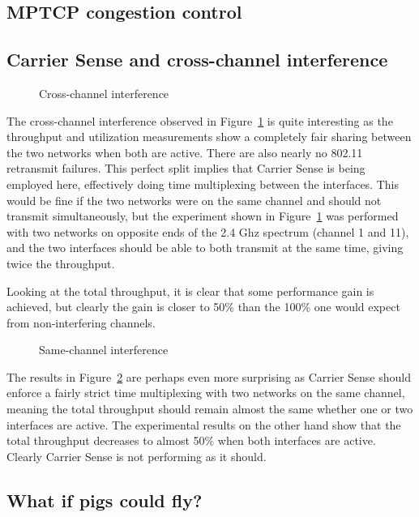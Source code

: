 \documentclass[12pt,a4paper]{article}
\begin{document}
\subsection{MPTCP congestion control}
\subsection{Carrier Sense and cross-channel interference}
\begin{figure}[h]
 \centering
 
 \caption{Cross-channel interference}\label{graph:cc-interference}
\end{figure}

The cross-channel interference observed in Figure~\ref{graph:cc-interference} is
quite interesting as the throughput and utilization measurements show a
completely fair sharing between the two networks when both are active. There are
also nearly no 802.11 retransmit failures. This perfect split implies that
Carrier Sense is being employed here, effectively doing time multiplexing
between the interfaces.  This would be fine if the two networks were on the same
channel and should not transmit simultaneously, but the experiment shown in
Figure~\ref{graph:cc-interference} was performed with two networks on opposite
ends of the 2.4 Ghz spectrum (channel 1 and 11), and the two interfaces should
be able to both transmit at the same time, giving twice the throughput.

Looking at the total throughput, it is clear that some performance gain is
achieved, but clearly the gain is closer to 50\% than the 100\% one would expect
from non-interfering channels.

\begin{figure}[h]
 \centering
 
 \caption{Same-channel interference}\label{graph:sc-interference}
\end{figure}

The results in Figure~\ref{graph:sc-interference} are perhaps even more
surprising as Carrier Sense should enforce a fairly strict time multiplexing
with two networks on the same channel, meaning the total throughput should
remain almost the same whether one or two interfaces are active. The
experimental results on the other hand show that the total throughput decreases
to almost 50\% when both interfaces are active. Clearly Carrier Sense is not
performing as it should.

\subsection{What if pigs could fly?} %
\end{document}
